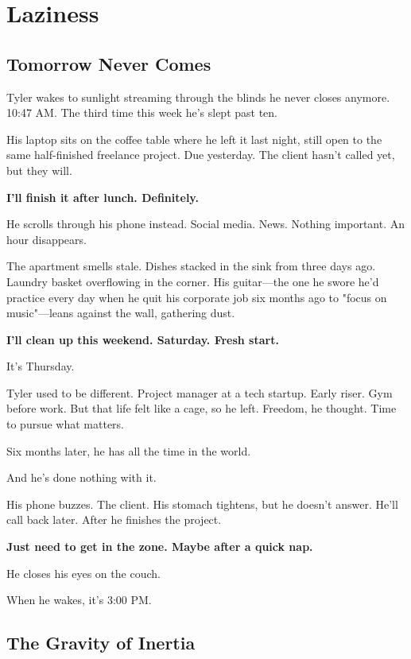 \documentclass[11pt,twoside]{book}
\begin{document}
\chapter{Laziness}

\section*{Tomorrow Never Comes}

Tyler wakes to sunlight streaming through the blinds he never closes anymore. 10:47 AM. The third time this week he's slept past ten.

His laptop sits on the coffee table where he left it last night, still open to the same half-finished freelance project. Due yesterday. The client hasn't called yet, but they will.

\textbf{I'll finish it after lunch. Definitely.}

He scrolls through his phone instead. Social media. News. Nothing important. An hour disappears.

The apartment smells stale. Dishes stacked in the sink from three days ago. Laundry basket overflowing in the corner. His guitar—the one he swore he'd practice every day when he quit his corporate job six months ago to "focus on music"—leans against the wall, gathering dust.

\textbf{I'll clean up this weekend. Saturday. Fresh start.}

It's Thursday.

Tyler used to be different. Project manager at a tech startup. Early riser. Gym before work. But that life felt like a cage, so he left. Freedom, he thought. Time to pursue what matters.

Six months later, he has all the time in the world.

And he's done nothing with it.

His phone buzzes. The client. His stomach tightens, but he doesn't answer. He'll call back later. After he finishes the project.

\textbf{Just need to get in the zone. Maybe after a quick nap.}

He closes his eyes on the couch.

When he wakes, it's 3:00 PM.

\section*{The Gravity of Inertia}
\end{document}
